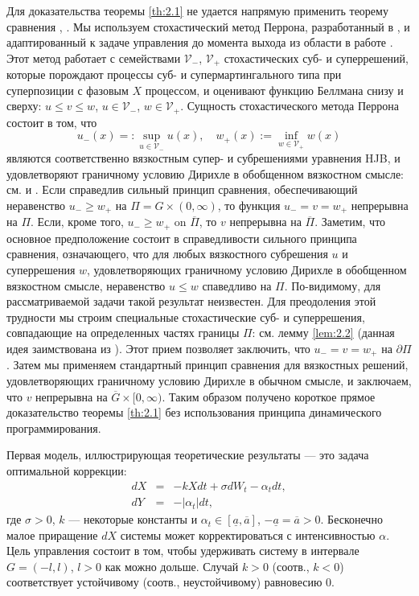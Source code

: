 Для доказательства теоремы \ref{th:2.1} не удается
напрямую применить теорему сравнения \cite[теорема 2.1]{BarRou98}, \cite[теорема 2.1]{Cha04}. 
Мы используем стохастический метод Перрона, разработанный в \cite{BaySir13}, и адаптированный к задаче управления до момента выхода из области в работе \cite{Rok14}. Этот метод работает с семействами $\mathcal V_-$, $\mathcal V_+$ стохастических суб- и суперрешений, которые порождают процессы суб- и супермартингального типа при суперпозиции с фазовым $X$ процессом, и оценивают функцию Беллмана снизу и сверху: $u\le v\le w$, $u\in\mathcal V_-$, $w\in\mathcal V_+$. Сущность стохастического метода Перрона состоит в том, что
$$ u_-(x)=:\sup_{u\in\mathcal V_-} u(x),\quad w_+(x):=\inf_{w\in\mathcal V_+} w(x)$$
являются соответственно вязкостным супер- и субрешениями уравнения HJB, и удовлетворяют граничному условию Дирихле в обобщенном вязкостном смысле: см. \cite[определение 7.4]{CraIshLio92} и \cite[теоремы 2, 3]{Rok14}. Если справедлив сильный принцип сравнения, обеспечивающий неравенство $u_-\ge w_+$ на $\Pi=G\times (0,\infty)$, то функция $u_-=v=w_+$ непрерывна на $\Pi$. Если, кроме того, $u_-\ge w_+$ on $\overline\Pi$, то $v$ непрерывна на $\overline\Pi$. Заметим, что основное предположение \cite{Rok14} состоит в справедливости сильного принципа сравнения, означающего, что для любых вязкостного субрешения $u$ и суперрешения $w$, удовлетворяющих граничному условию Дирихле в обобщенном вязкостном смысле, неравенство $u\le w$ спаведливо на $\Pi$. По-видимому, для рассматриваемой задачи такой результат неизвестен. Для преодоления этой трудности мы строим специальные стохастические суб- и суперрешения, совпадающие на определенных частях границы $\Pi$: см. лемму \ref{lem:2.2} (данная идея заимствована из \cite{BayZha15}). Этот прием позволяет заключить, что $u_-=v=w_+$ на $\partial\Pi$. Затем мы применяем стандартный принцип сравнения для вязкостных решений, удовлетворяющих граничному условию Дирихле в обычном смысле, и заключаем, что $v$ непрерывна на $\overline G\times [0,\infty)$. Таким образом получено короткое прямое доказательство теоремы \ref{th:2.1} без использования принципа динамического программирования.

Первая модель, иллюстрирующая теоретические результаты --- это задача оптимальной коррекции:
\begin{eqnarray*}
dX &=& -kXdt+\sigma dW_t-\alpha_t dt, \\
dY &=& -|\alpha_t|dt,
\end{eqnarray*}
где $\sigma>0$, $k$ --- некоторые константы и $\alpha_t\in [\underline a,\overline a]$, $-\underline a=\overline a>0$. Бесконечно малое приращение $dX$ системы может корректироваться с интенсивностью $\alpha$. Цель управления состоит в том, чтобы удерживать систему в интервале $G=(-l,l)$, $l>0$ как можно дольше. Случай $k>0$ (соотв., $k<0$) соответствует устойчивому (соотв., неустойчивому) равновесию $0$. 

